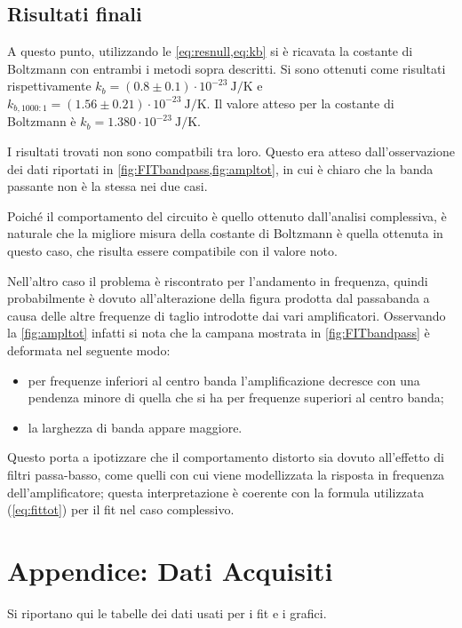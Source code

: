 \documentclass[a4paper,10pt]{article}
\begin{document}
\subsection{Risultati finali}
A questo punto, utilizzando le \cref{eq:resnull,eq:kb} si è ricavata la costante di Boltzmann con entrambi i metodi sopra descritti. Si sono ottenuti come risultati rispettivamente $k_b = (0.8\pm0.1)\cdot 10^{-23}~\text{J/K}$ e $k_{b,1000:1} = (1.56\pm0.21)\cdot 10^{-23}~\text{J/K} $. Il valore atteso per la costante di Boltzmann è $k_b = 1.380\cdot 10^{-23}~\text{J/K}$.
\newline

I risultati trovati non sono compatbili tra loro. Questo era atteso dall'osservazione dei dati riportati in \cref{fig:FITbandpass,fig:ampltot}, in cui è chiaro che la banda passante non è la stessa nei due casi.

Poiché il comportamento del circuito è quello ottenuto dall'analisi complessiva, è naturale che la migliore misura della costante di Boltzmann è quella ottenuta in questo caso, che risulta essere compatibile con il valore noto.

Nell'altro caso il problema è riscontrato per l'andamento in frequenza, quindi probabilmente è dovuto all'alterazione della figura prodotta dal passabanda a causa delle altre frequenze di taglio introdotte dai vari amplificatori.
Osservando la \cref{fig:ampltot} infatti si nota che la campana mostrata in \cref{fig:FITbandpass} è deformata nel seguente modo:
\begin{itemize}
	\item per frequenze inferiori al centro banda l'amplificazione decresce con una pendenza minore di quella che si ha per frequenze superiori al centro banda;
	\item la larghezza di banda appare maggiore.
\end{itemize}
Questo porta a ipotizzare che il comportamento distorto sia dovuto all'effetto di filtri passa-basso, come quelli con cui viene modellizzata la risposta in frequenza dell'amplificatore; questa interpretazione è coerente con la formula utilizzata (\cref{eq:fittot}) per il fit nel caso complessivo.

\pagebreak

\section{Appendice: Dati Acquisiti}
Si riportano qui le tabelle dei dati usati per i fit e i grafici.
\end{document}
